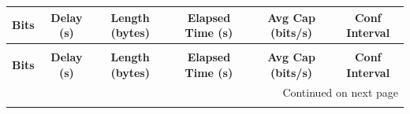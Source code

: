 \documentclass[10pt,a4paper]{article}
\begin{document}
\begin{center}
\begin{longtable}{cccccc}
\toprule
\textbf{Bits} & \textbf{Delay (s)} & \textbf{Length (bytes)} & \textbf{Elapsed Time (s)} & \textbf{Avg Cap (bits/s)} & \textbf{Conf Interval}\\
\midrule
\endfirsthead

\multicolumn{6}{c}{} \\
\toprule
\textbf{Bits} & \textbf{Delay (s)} & \textbf{Length (bytes)} & \textbf{Elapsed Time (s)} & \textbf{Avg Cap (bits/s)} & \textbf{Conf Interval}\\
\midrule
\endhead

\midrule \multicolumn{6}{r}{{Continued on next page}} \\
\endfoot

\bottomrule
\endlastfoot


\end{longtable}
\end{center}
\end{document}

